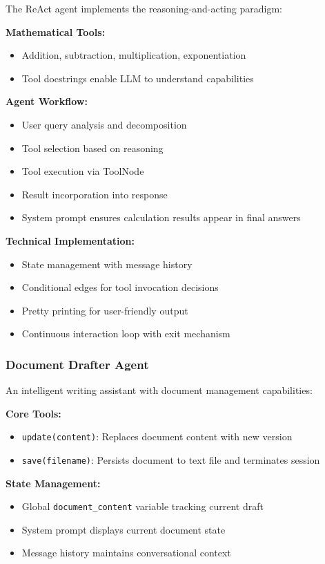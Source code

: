 \documentclass[12pt,a4paper]{article}
\begin{document}
The ReAct agent implements the reasoning-and-acting paradigm:

\textbf{Mathematical Tools:}
\begin{itemize}
    \item Addition, subtraction, multiplication, exponentiation
    \item Tool docstrings enable LLM to understand capabilities
\end{itemize}

\textbf{Agent Workflow:}
\begin{itemize}
    \item User query analysis and decomposition
    \item Tool selection based on reasoning
    \item Tool execution via ToolNode
    \item Result incorporation into response
    \item System prompt ensures calculation results appear in final answers
\end{itemize}

\textbf{Technical Implementation:}
\begin{itemize}
    \item State management with message history
    \item Conditional edges for tool invocation decisions
    \item Pretty printing for user-friendly output
    \item Continuous interaction loop with exit mechanism
\end{itemize}

\subsubsection{Document Drafter Agent}

An intelligent writing assistant with document management capabilities:

\textbf{Core Tools:}
\begin{itemize}
    \item \texttt{update(content)}: Replaces document content with new version
    \item \texttt{save(filename)}: Persists document to text file and terminates session
\end{itemize}

\textbf{State Management:}
\begin{itemize}
    \item Global \texttt{document\_content} variable tracking current draft
    \item System prompt displays current document state
    \item Message history maintains conversational context
\end{itemize}
\end{document}
